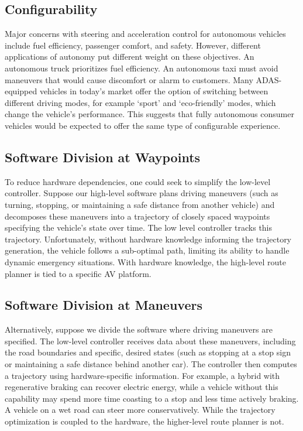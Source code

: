 \documentclass[letterpaper, 10 pt, conference]{ieeeconf}  %
\begin{document}
\subsection{Configurability}
Major concerns with steering and acceleration control for autonomous vehicles include fuel efficiency, passenger comfort, and safety. However, different applications of autonomy put different weight on these objectives. An autonomous truck prioritizes fuel efficiency. An autonomous taxi must avoid maneuvers that would cause discomfort or alarm to customers. Many ADAS-equipped vehicles in today's market offer the option of switching between different driving modes, for example `sport' and `eco-friendly' modes, which change the vehicle's performance. This suggests that fully autonomous consumer vehicles would be expected to offer the same type of configurable experience.


\subsection{Software Division at Waypoints}

To reduce hardware dependencies, one could seek to simplify the low-level controller. Suppose our high-level software plans driving maneuvers (such as turning, stopping, or maintaining a safe distance from another vehicle) and decomposes these maneuvers into a trajectory of closely spaced waypoints specifying the vehicle's state over time. The low level controller tracks this trajectory. Unfortunately, without hardware knowledge informing the trajectory generation, the vehicle follows a sub-optimal path, limiting its ability to handle dynamic emergency situations. With hardware knowledge, the high-level route planner is tied to a specific AV platform.

\subsection{Software Division at Maneuvers} Alternatively, suppose we divide the software where driving maneuvers are specified. The low-level controller receives data about these maneuvers, including the road boundaries and specific, desired states (such as stopping at a stop sign or maintaining a safe distance behind another car). The controller then computes a trajectory using hardware-specific information. For example, a hybrid with regenerative braking can recover electric energy, while a vehicle without this capability may spend more time coasting to a stop and less time actively braking. A vehicle on a wet road can steer more conservatively. While the trajectory optimization is coupled to the hardware, the higher-level route planner is not.
\end{document}
